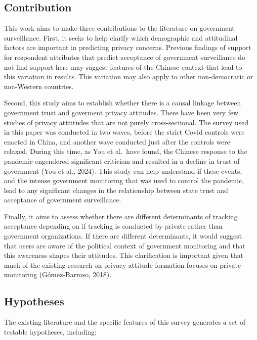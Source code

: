 \documentclass[
  letterpaper,
  DIV=11,
  numbers=noendperiod]{scrartcl}
\begin{document}
\subsection{Contribution}\label{contribution}

This work aims to make three contributions to the literature on
government surveillance. First, it seeks to help clarify which
demographic and attitudinal factors are important in predicting privacy
concerns. Previous findings of support for respondent attributes that
predict acceptance of government surveillance do not find support here
may suggest features of the Chinese context that lead to this variation
in results. This variation may also apply to other non-democratic or
non-Western countries.

Second, this study aims to establish whether there is a causal linkage
between government trust and goverment privacy attitudes. There have
been very few studies of privacy atttitudes that are not purely
cross-sectional. The survey used in this paper was conducted in two
waves, before the strict Covid controls were enacted in China, and
another wave conducted just after the controls were relaxed. During this
time, as You et al.~have found, the Chinese response to the pandemic
engendered significant criticism and resulted in a decline in trust of
government (You et al., 2024). This study can help understand if these
events, and the intense government monitoring that was used to control
the pandemic, lead to any significant changes in the relationship
between state trust and acceptance of government surveillance.

Finally, it aims to assess whether there are different determinants of
tracking acceptance depending on if tracking is conducted by private
rather than government organizations. If there are different
determinants, it would suggest that users are aware of the political
context of government monitoring and that this awareness shapes their
attitudes. This clarification is important given that much of the
existing research on privacy attitude formation focuses on private
monitoring (Gómez-Barroso, 2018).

\subsection{Hypotheses}\label{hypotheses}

The existing literature and the specific features of this survey
generates a set of testable hypotheses, including:
\end{document}
